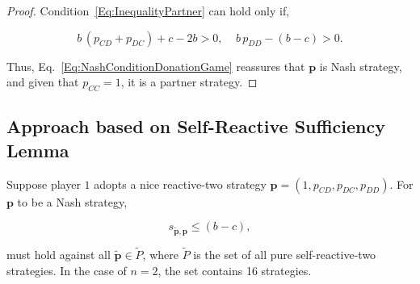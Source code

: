 \documentclass{article}
\theoremstyle{definition}
\begin{document}
\begin{proof}
Condition~\eqref{Eq:InequalityPartner} can hold only if,

\begin{equation}
  b \, (p_{CD}\!+\!p_{DC})\!+\!c\!-\!2b > 0,~~~~~ b\, p_{DD} - (b\!-\!c) > 0.
\end{equation}

Thus, Eq.~\eqref{Eq:NashConditionDonationGame} reassures that $\mathbf{p}$
is Nash strategy, and given that $p_{CC} = 1$, it is a partner strategy.
\end{proof}

\subsection{Approach based on Self-Reactive Sufficiency Lemma}

Suppose player $1$ adopts a nice reactive-two strategy
$\mathbf{p}\!=\!(1, p_{CD}, p_{DC}, p_{DD})$. For $\mathbf{p}$ to be a Nash
strategy,

\begin{equation}\label{Eq:NashReactive}
  s_{\mathbf{\tilde{p}}, \mathbf{p}} \leq (b - c),
\end{equation}

must hold against all \(\mathbf{\tilde{p}} \in \tilde{P}\), where \(\tilde{P}\) is the
set of all pure self-reactive-two strategies. In the case of $n=2$, the set
contains 16 strategies.
\end{document}
